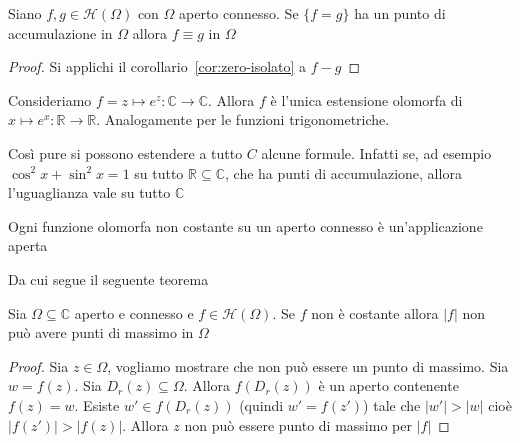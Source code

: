\begin{corollary}\label{cor:estensione-analitica}
    Siano \(f, g \in \mathcal{H}{(\Omega)}\) con \(\Omega\) aperto connesso. Se
    \( \{ f = g\} \) ha un punto di accumulazione in \(\Omega\) allora \(f
    \equiv g\) in \(\Omega\) 
\end{corollary}
\begin{proof}
    Si applichi il corollario~\ref{cor:zero-isolato} a \(f-g\)
\end{proof}
\begin{example}
    Consideriamo \(f = z \mapsto e^{z} : \mathbb{C}\to \mathbb{C}\). Allora
    \(f\) è l'unica estensione olomorfa di \(x \mapsto e^{x} : \mathbb{R} \to
    \mathbb{R}\). Analogamente per le funzioni trigonometriche.

    Così pure si possono estendere a tutto \(C\) alcune formule. Infatti se, ad
    esempio \(\cos^2 x + \sin^2 x = 1\) su tutto \(\mathbb{R} \subseteq \mathbb{C} \), che ha punti di
    accumulazione, allora l'uguaglianza vale su tutto \(\mathbb{C}\)
\end{example}

\begin{theorem}\label{thm:olomorfa-aperta}
    Ogni funzione olomorfa non costante su un aperto connesso è un'applicazione aperta
\end{theorem}

Da cui segue il seguente teorema
\begin{theorem}\label{thm:massimo-modulo}
Sia \(\Omega \subseteq \mathbb{C} \) aperto e connesso e \(f \in
\mathcal{H}{(\Omega)}\). Se \(f\) non è costante allora \(|f|\) non può avere
punti di massimo in \(\Omega\) 
\end{theorem}

\begin{proof}
    Sia \(z \in \Omega\), vogliamo mostrare che non può essere un punto di
    massimo. Sia \(w = f{(z)}\). Sia \(D_r{(z)} \subseteq \Omega \). Allora
    \(f{(D_r{(z)})}\) è un aperto contenente \(f{(z)} = w\).
    Esiste \(w' \in f{(D_r{(z)})}\) (quindi \(w' = f{(z')}\)) tale che \(|w'| >
    |w|\) cioè \(|f{(z')}| > |f{(z)}|\). Allora \(z\) non può essere punto di
    massimo per \(|f|\) 
\end{proof}

